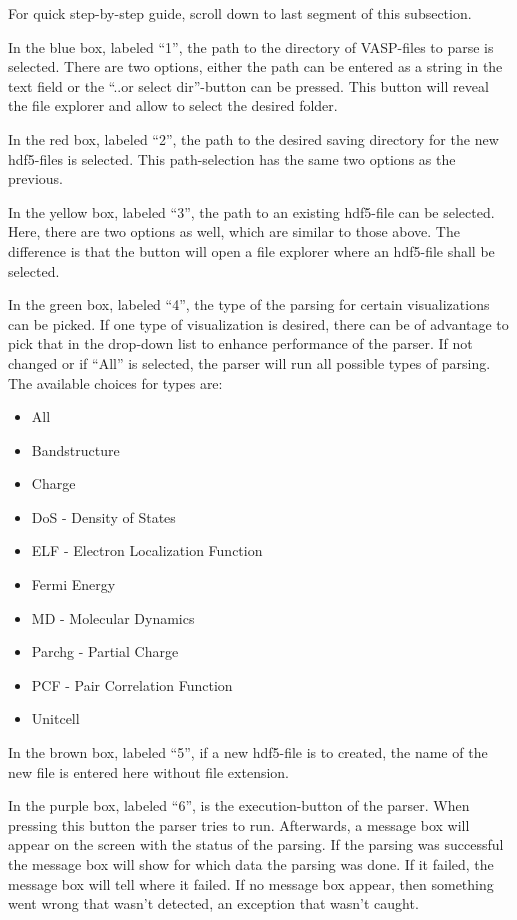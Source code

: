 For quick step-by-step guide, scroll down to last segment of this subsection.\newline

In the blue box, labeled ``1'', the path to the directory of VASP-files to parse is selected. There are two options, either the path can be entered as a string in the text field or the ``..or select dir''-button can be pressed. This button will reveal the file explorer and allow to select the desired folder.

In the red box, labeled ``2'', the path to the desired saving directory for the new hdf5-files is selected. This path-selection has the same two options as the previous.

In the yellow box, labeled ``3'', the path to an existing hdf5-file can be selected. Here, there are two options as well, which are similar to those above. The difference is that the button will open a file explorer where an hdf5-file shall be selected.

In the green box, labeled ``4'', the type of the parsing for certain visualizations can be picked. If one type of visualization is desired, there can be of advantage to pick that in the drop-down list to enhance performance of the parser. If not changed or if ``All'' is selected, the parser will run all possible types of parsing.
The available choices for types are:
\begin{itemize}
    \item All
    \item Bandstructure
    \item Charge
    \item DoS - Density of States
    \item ELF - Electron Localization Function
    \item Fermi Energy
    \item MD - Molecular Dynamics
    \item Parchg - Partial Charge
    \item PCF - Pair Correlation Function
    \item Unitcell
\end{itemize}

In the brown box, labeled ``5'', if a new hdf5-file is to created, the name of the new file is entered here without file extension.

In the purple box, labeled ``6'', is the execution-button of the parser. When pressing this button the parser tries to run. Afterwards, a message box will appear on the screen with the status of the parsing. If the parsing was successful the message box will show for which data the parsing was done. If it failed, the message box will tell where it failed. If no message box appear, then something went wrong that wasn't detected, an exception that wasn't caught.


